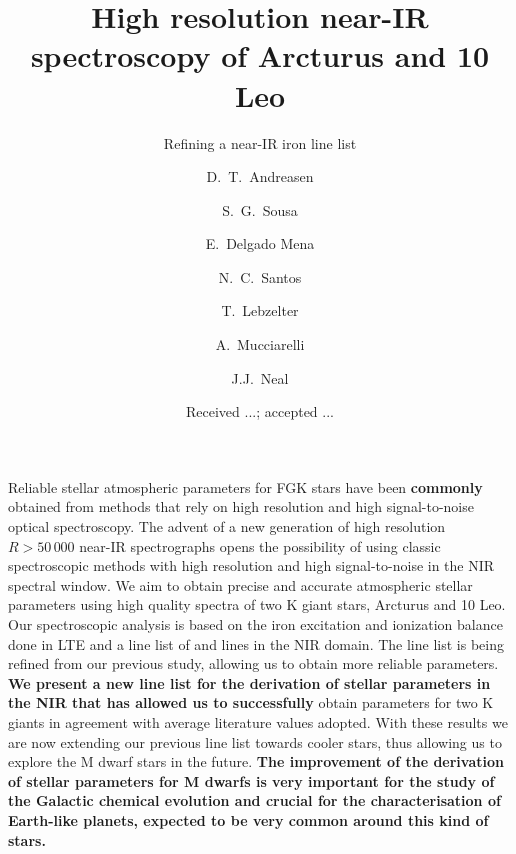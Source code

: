 \documentclass{aa}
\begin{document}
\title{High resolution near-IR spectroscopy of Arcturus and 10 Leo}
\subtitle{Refining a near-IR iron line list}


\author{ D.~T.~Andreasen
    \and S.~G.~Sousa
    \and E.~Delgado Mena
    \and N.~C.~Santos
    \and T.~Lebzelter
    \and A.~Mucciarelli
    \and J.J.~Neal}







\date{Received ...; accepted ...}

\abstract
{Reliable stellar atmospheric parameters for FGK stars have been {\bf commonly}
obtained from methods that rely on high resolution and high signal-to-noise
optical spectroscopy. The advent of a new generation of high resolution
{\bf $R>50\,000$} near-IR spectrographs opens the possibility of using classic
spectroscopic methods with high resolution and high signal-to-noise in the NIR
spectral window.}
{We aim to obtain precise and accurate atmospheric stellar parameters using high
quality spectra of two K giant stars, Arcturus and 10 Leo.}
{Our spectroscopic analysis is based on the iron excitation and ionization
balance done in LTE and a line list of  and  lines in the
NIR domain. The line list is being refined from our previous study, allowing us
to obtain more reliable parameters.}
{{\bf We present a new line list for the derivation of stellar parameters in the
NIR that has allowed us to successfully} obtain parameters for two K giants in
agreement with average literature values adopted.}
{With these results we are now extending our previous line list towards cooler
stars, thus allowing us to explore the M dwarf stars in the future. {\bf The
improvement of the derivation of stellar parameters for M dwarfs is very
important for the study of the Galactic chemical evolution and crucial for the
characterisation of Earth-like planets, expected to be very common around this
kind of stars.}}
\end{document}
